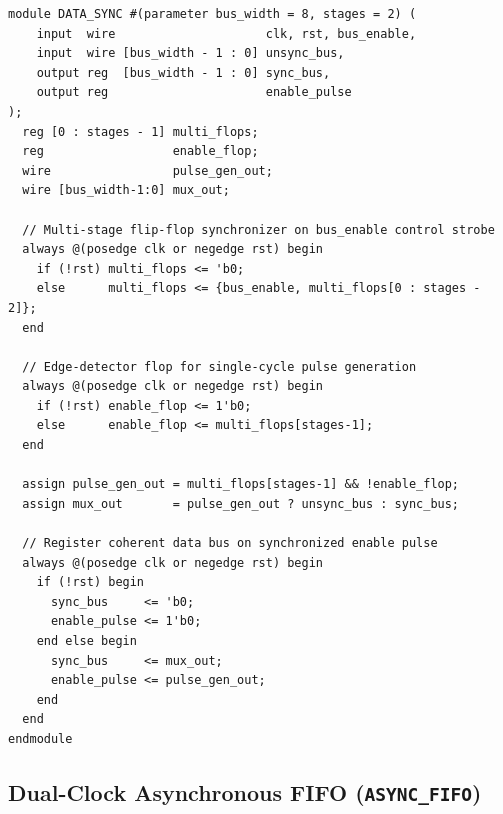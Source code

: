 \documentclass[11pt,a4paper]{article}
\begin{document}
\begin{lstlisting}[caption={RTL Implementation of the Multi-Bit Data Synchronizer (DATA\_SYNC.v).}]
module DATA_SYNC #(parameter bus_width = 8, stages = 2) (
    input  wire                     clk, rst, bus_enable,
    input  wire [bus_width - 1 : 0] unsync_bus,
    output reg  [bus_width - 1 : 0] sync_bus,
    output reg                      enable_pulse
);
  reg [0 : stages - 1] multi_flops;
  reg                  enable_flop;
  wire                 pulse_gen_out;
  wire [bus_width-1:0] mux_out;

  // Multi-stage flip-flop synchronizer on bus_enable control strobe
  always @(posedge clk or negedge rst) begin
    if (!rst) multi_flops <= 'b0;
    else      multi_flops <= {bus_enable, multi_flops[0 : stages - 2]};
  end

  // Edge-detector flop for single-cycle pulse generation
  always @(posedge clk or negedge rst) begin
    if (!rst) enable_flop <= 1'b0;
    else      enable_flop <= multi_flops[stages-1];
  end

  assign pulse_gen_out = multi_flops[stages-1] && !enable_flop;
  assign mux_out       = pulse_gen_out ? unsync_bus : sync_bus;

  // Register coherent data bus on synchronized enable pulse
  always @(posedge clk or negedge rst) begin
    if (!rst) begin
      sync_bus     <= 'b0;
      enable_pulse <= 1'b0;
    end else begin
      sync_bus     <= mux_out;
      enable_pulse <= pulse_gen_out;
    end
  end
endmodule
\end{lstlisting}

\subsection{Dual-Clock Asynchronous FIFO (\texttt{ASYNC\_FIFO})}
\end{document}
